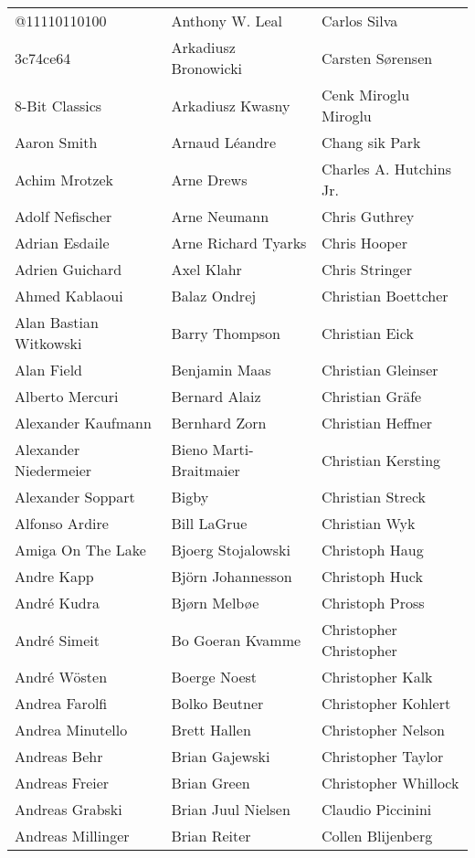 \newpage
\setlength{\tabcolsep}{1mm}
\begin{tabular}{p{4.5cm}p{4.5cm}p{4.5cm}}
@11110110100 & Anthony W. Leal & Carlos Silva \\
3c74ce64 & Arkadiusz Bronowicki & Carsten Sørensen \\
8-Bit Classics & Arkadiusz Kwasny & Cenk Miroglu Miroglu \\
Aaron Smith & Arnaud Léandre & Chang sik Park \\
Achim Mrotzek & Arne Drews & Charles A. Hutchins Jr. \\
Adolf Nefischer & Arne Neumann & Chris Guthrey \\
Adrian Esdaile & Arne Richard Tyarks & Chris Hooper \\
Adrien Guichard & Axel Klahr & Chris Stringer \\
Ahmed Kablaoui & Balaz Ondrej & Christian Boettcher \\
Alan Bastian Witkowski & Barry Thompson & Christian Eick \\
Alan Field & Benjamin Maas & Christian Gleinser \\
Alberto Mercuri & Bernard Alaiz & Christian Gräfe \\
Alexander Kaufmann & Bernhard Zorn & Christian Heffner \\
Alexander Niedermeier & Bieno Marti-Braitmaier & Christian Kersting \\
Alexander Soppart & Bigby & Christian Streck \\
Alfonso Ardire & Bill LaGrue & Christian Wyk \\
Amiga On The Lake & Bjoerg Stojalowski & Christoph Haug \\
Andre Kapp & Björn Johannesson & Christoph Huck \\
André Kudra & Bjørn Melbøe & Christoph Pross \\
André Simeit & Bo Goeran Kvamme & Christopher Christopher \\
André Wösten & Boerge Noest & Christopher Kalk \\
Andrea Farolfi & Bolko Beutner & Christopher Kohlert \\
Andrea Minutello & Brett Hallen & Christopher Nelson \\
Andreas Behr & Brian Gajewski & Christopher Taylor \\
Andreas Freier & Brian Green & Christopher Whillock \\
Andreas Grabski & Brian Juul Nielsen & Claudio Piccinini \\
Andreas Millinger & Brian Reiter & Collen Blijenberg \\

\end{tabular}
